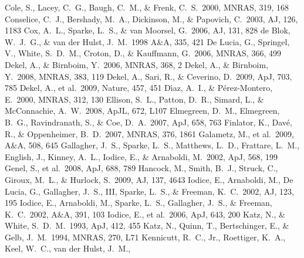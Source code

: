 \documentclass{aa}
\begin{document}
\begin{thebibliography}{}
 Cole, S., Lacey, C.~G.,
Baugh, C.~M., \& Frenk, C.~S.\ 2000, MNRAS, 319, 168
 Conselice, C.~J.,
Bershady, M.~A., Dickinson, M., \& Papovich, C.\ 2003, AJ, 126, 1183
 Cox, A.~L., Sparke, L.~S.,
\& van Moorsel, G.\ 2006, AJ, 131, 828
 de Blok, W.~J.~G., \&
  van der Hulst, J.~M.\ 1998 A\&A, 335, 421
 De Lucia, G.,
Springel, V., White, S.~D.~M., Croton, D.,
\& Kauffmann, G.\ 2006, MNRAS, 366, 499
 Dekel, A., \& Birnboim, Y.\ 2006, MNRAS, 368, 2
 Dekel, A., \& Birnboim, Y.\ 2008, MNRAS, 383, 119
 Dekel, A., Sari, R., \& Ceverino,
  D.\ 2009, ApJ, 703, 785
 Dekel, A., et al.\ 2009,
Nature, 457, 451
 D{\'{\i}}az, A.~I., \&
P{\'e}rez-Montero, E.\ 2000, MNRAS, 312, 130
 Ellison, S.~L., Patton,
D.~R., Simard, L., \& McConnachie, A.~W.\ 2008, ApJL, 672, L107
 Elmegreen, D.~M.,
Elmegreen, B.~G., Ravindranath, S., \& Coe, D.~A.\ 2007, ApJ, 658, 763
 Finlator, K.,
Dav{\'e}, R., \& Oppenheimer, B.~D.\ 2007, MNRAS, 376, 1861
 Galametz, M., et al.\ 2009, A\&A, 508, 645
 Gallagher, J.~S., Sparke,
  L.~S., Matthews, L.~D., Frattare, L.~M., English, J., Kinney, A.~L.,
  Iodice, E., \& Arnaboldi, M.\ 2002, ApJ, 568, 199
  Genel, S., et al.\ 2008,
ApJ, 688, 789
 Hancock, M., Smith,
B.~J., Struck, C., Giroux, M.~L., \& Hurlock, S.\ 2009, AJ, 137, 4643
 Iodice, E., Arnaboldi, M., De
  Lucia, G., Gallagher, J.~S., III, Sparke, L.~S., \& Freeman,
  K.~C.\ 2002, AJ, 123, 195
 Iodice, E., Arnaboldi, M.,
  Sparke, L.~S., Gallagher, J.~S., \& Freeman, K.~C.\ 2002, A\&A, 391,
  103
 Iodice, E., et al.\ 2006, ApJ, 643, 200
 Katz, N., \& White, S.~D.~M.\ 1993, ApJ, 412, 455
 Katz, N., Quinn, T.,
Bertschinger, E., \& Gelb, J.~M.\ 1994, MNRAS, 270, L71
 Kennicutt, R.~C.,
Jr., Roettiger, K.~A., Keel, W.~C., van der Hulst, J.~M.,

\end{thebibliography}
\end{document}
